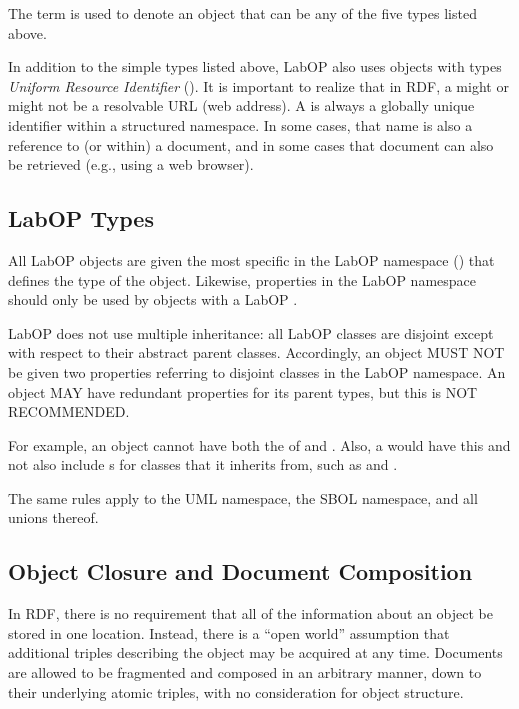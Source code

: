 The term  is used to denote an object that can be any of the five types listed above.

In addition to the simple types listed above, LabOP also uses objects with types \emph{Uniform Resource Identifier} (). It is important to realize that in RDF, a  might or might not be a resolvable URL (web address).  A  is always a globally unique identifier within a structured namespace.  In some cases, that name is also a reference to (or within) a document, and in some cases that document can also be retrieved (e.g., using a web browser).


\subsection{LabOP Types}
\label{sec:labopTypes}

All LabOP objects are given the most specific  in the LabOP namespace () that defines the type of the object.  
Likewise, properties in the LabOP namespace should only be used by objects with a LabOP .

LabOP does not use multiple inheritance: all LabOP classes are disjoint except with respect to their abstract parent classes.
Accordingly, an object MUST NOT be given two  properties referring to disjoint classes in the LabOP namespace.
An object MAY have redundant  properties for its parent types, but this is NOT RECOMMENDED.

For example, an object cannot have both the  of  and .  Also, a  would have this  and not also include s for classes that it inherits from, such as  and .

The same rules apply to the UML namespace, the SBOL namespace, and all unions thereof.


\subsection{Object Closure and Document Composition}

In RDF, there is no requirement that all of the information about an object be stored in one location.  
Instead, there is a ``open world'' assumption that additional triples describing the object may be acquired at any time.
Documents are allowed to be fragmented and composed in an arbitrary manner, down to their underlying atomic triples, with no consideration for object structure.

